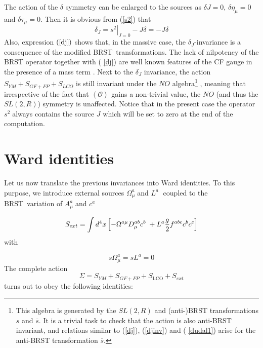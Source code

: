 \documentclass[a4paper,12pt]{article}
\newcommand{\sect}[1]{ \section{#1} \setcounter{equation}{0} }
\begin{document}
The action of the $\delta$ symmetry can be enlarged to the sources as $%
\delta J=0$, $\delta\eta_{\mu}=0$ and $\delta \tau_{\mu}=0$. Then it is
obvious from (\ref{s2}) that
\begin{equation}  \label{dudal1}
\delta_{J}=\left.s^{2}\right|_{J=0}-J\delta=-J\delta
\end{equation}
Also, expression $\left( \ref{dj}\right) $ shows that, in the massive case,
the $\delta _{J}$-invariance is a consequence of the modified BRST\
transformations. The lack of nilpotency of the BRST operator together with (%
\ref{dj}) are well known features of the CF gauge in the presence of a mass
term \cite{ds}. Next to the $\delta_{J}$ invariance, the action $%
S_{YM}+S_{GF+FP}+S_{LCO}$ is still invariant under the $NO$ algebra\footnote{%
This algebra is generated by the $SL(2,R)$ and (anti-)BRST transformations $s
$ and $\overline{s}$. It is a trivial task to check that the action is also
anti-BRST invariant, and relations similar to (\ref{dj}), (\ref{djinv}) and (%
\ref{dudal1}) arise for the anti-BRST transformation $\overline{s}$.} \cite
{Dudal:2002ye}, meaning that irrespective of the fact that $\left\langle
\mathcal{O}\right\rangle$ gains a non-trivial value, the $NO$ (and thus the $%
SL(2,R)$) symmetry is unaffected. \newline
\newline
Notice that in the present case the operator $s^{2}\;$always contains the
source $J$ which will be set to zero at the end of the computation.

\sect{Ward identities}

\label{sec2}

Let us now translate the previous invariances into Ward identities. To this
purpose, we introduce external sources $\Omega _{\mu }^{a}\;$and $L^{a}\;$%
coupled to the BRST\ variation of $A_{\mu }^{a}\;$and $c^{a}$

\begin{equation}
S_{ext}=\int d^{4}x\left[ -\Omega ^{a\mu }D_{\mu }^{ab}c^{b}\;+L^{a}\frac{g}{%
2}f^{abc}c^{b}c^{c}\right]  \label{om}
\end{equation}
with

\[
s\Omega _{\mu }^{a}=sL^{a}=0
\]
The complete action
\begin{equation}
\Sigma =S_{YM}+S_{GF+FP}+S_{\mathrm{LCO}}+S_{ext}  \label{sl}
\end{equation}
turns out to obey the following identities:
\end{document}
